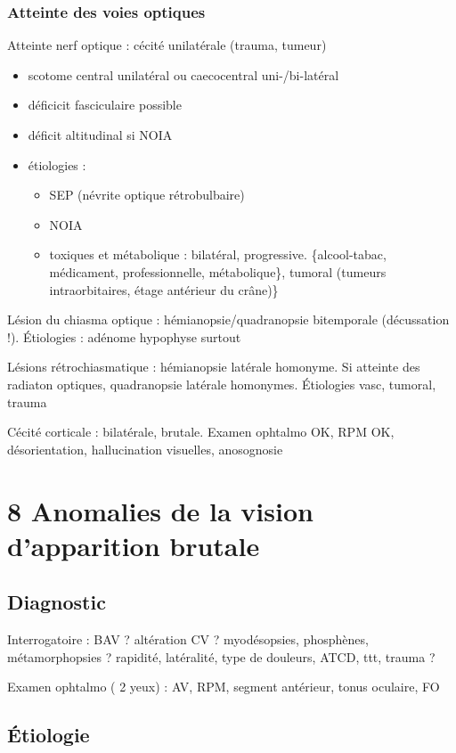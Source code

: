 \documentclass[11pt]{article}
\begin{document}
\subsubsection{Atteinte des voies optiques}
\label{sec:org0283737}
Atteinte nerf optique : cécité unilatérale (trauma, tumeur) 
\begin{itemize}
\item scotome central unilatéral ou caecocentral uni-/bi-latéral
\item déficicit fasciculaire possible
\item déficit altitudinal si \gls{NOIA}
\item étiologies :
\begin{itemize}
\item SEP (névrite optique rétrobulbaire)
\item NOIA
\item toxiques et métabolique : bilatéral, progressive. \{alcool-tabac, médicament,
professionnelle, métabolique\}, tumoral (tumeurs intraorbitaires, étage
antérieur du crâne)\}
\end{itemize}
\end{itemize}

Lésion du chiasma optique : hémianopsie/quadranopsie bitemporale (décussation
!). Étiologies : adénome hypophyse surtout

Lésions rétrochiasmatique : hémianopsie latérale homonyme. Si atteinte des
radiaton optiques, quadranopsie latérale homonymes. Étiologies vasc, tumoral,
trauma

Cécité corticale : bilatérale, brutale. Examen ophtalmo OK, RPM OK,
désorientation, hallucination visuelles, anosognosie
\section{8 Anomalies de la vision d'apparition brutale}
\label{sec:org4c5aa65}
\subsection{Diagnostic}
\label{sec:org86e1015}
Interrogatoire : BAV ? altération CV ? myodésopsies,  phosphènes,
métamorphopsies ? rapidité, latéralité, type de douleurs, ATCD, ttt, trauma ?

Examen ophtalmo ( 2 yeux) : AV, RPM, segment antérieur, tonus oculaire, FO

\subsection{Étiologie}
\label{sec:orgaed12f6}
\end{document}
